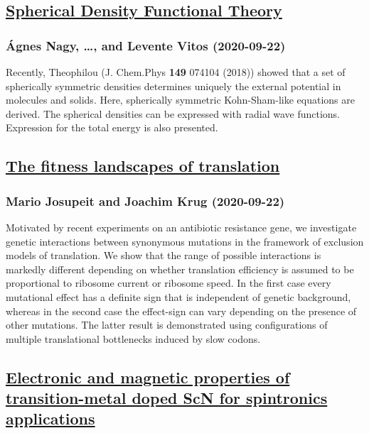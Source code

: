 {\subsection*{\href{http://arxiv.org/abs/2009.10624v1}{Spherical Density Functional Theory}}
\subsubsection*{Ágnes Nagy, \dots, and Levente Vitos (2020-09-22)}
Recently, Theophilou (J. Chem.Phys {\bf 149} 074104 (2018)) showed that a set
of spherically symmetric densities determines uniquely the external potential
in molecules and solids. Here, spherically symmetric Kohn-Sham-like equations
are derived. The spherical densities can be expressed with radial wave
functions. Expression for the total energy is also presented.

\subsection*{\href{http://arxiv.org/abs/2009.10621v1}{The fitness landscapes of translation}}
\subsubsection*{Mario Josupeit and Joachim Krug (2020-09-22)}
Motivated by recent experiments on an antibiotic resistance gene, we
investigate genetic interactions between synonymous mutations in the framework
of exclusion models of translation. We show that the range of possible
interactions is markedly different depending on whether translation efficiency
is assumed to be proportional to ribosome current or ribosome speed. In the
first case every mutational effect has a definite sign that is independent of
genetic background, whereas in the second case the effect-sign can vary
depending on the presence of other mutations. The latter result is demonstrated
using configurations of multiple translational bottlenecks induced by slow
codons.

\subsection*{\href{http://arxiv.org/abs/2009.10611v1}{Electronic and magnetic properties of transition-metal doped ScN for  spintronics applications}}
}
